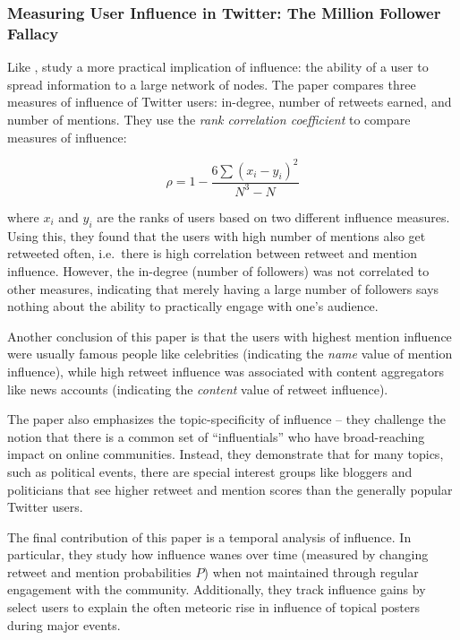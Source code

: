 \documentclass[10pt]{article}
\begin{document}
\subsubsection{Measuring User Influence in Twitter: The Million Follower Fallacy
  \citep{cha2010measuring}}

Like \cite{bakshy2011everyone}, \citet{cha2010measuring} study a more practical
implication of influence: the ability of a user to spread information to a
large network of nodes. The paper compares three measures of influence of
Twitter users: in-degree, number of retweets earned, and number of mentions.
They use the \textit{rank correlation coefficient} to compare measures of
influence:

\begin{equation}
  \rho = 1 - \frac{6\sum{(x_i - y_i)^2}}{N^3 - N}
\end{equation}

where $x_i$ and $y_i$ are the ranks of users based on two different influence
measures. Using this, they found that the users with high number of mentions
also get retweeted often, i.e.\ there is high correlation between retweet and
mention influence. However, the in-degree (number of followers) was not
correlated to other measures, indicating that merely having a large number of
followers says nothing about the ability to practically engage with one's
audience.

Another conclusion of this paper is that the users with highest mention
influence were usually famous people like celebrities (indicating the
\emph{name} value of mention influence), while high retweet influence was
associated with content aggregators like news accounts (indicating the
\emph{content} value of retweet influence).

The paper also emphasizes the topic-specificity of influence -- they challenge
the notion that there is a common set of ``influentials'' who have
broad-reaching impact on online communities. Instead, they demonstrate that for
many topics, such as political events, there are special interest groups like
bloggers and politicians that see higher retweet and mention scores than the
generally popular Twitter users.

The final contribution of this paper is a temporal analysis of influence. In
particular, they study how influence wanes over time (measured by changing retweet
and mention probabilities $P$) when not maintained through regular engagement
with the community. Additionally, they track influence gains by select users
to explain the often meteoric rise in influence of topical posters during major
events.
\end{document}
